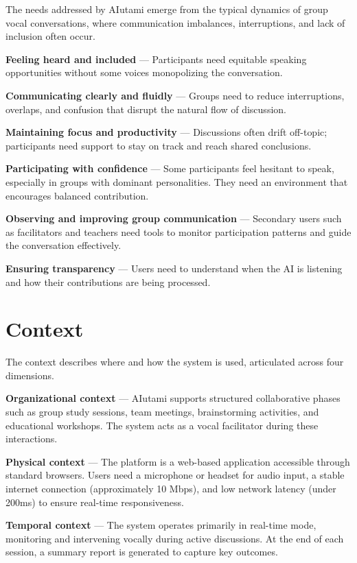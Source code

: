 The needs addressed by AIutami emerge from the typical dynamics of group vocal conversations, where communication imbalances, interruptions, and lack of inclusion often occur.

\textbf{Feeling heard and included} --- Participants need equitable speaking opportunities without some voices monopolizing the conversation.

\textbf{Communicating clearly and fluidly} --- Groups need to reduce interruptions, overlaps, and confusion that disrupt the natural flow of discussion.

\textbf{Maintaining focus and productivity} --- Discussions often drift off-topic; participants need support to stay on track and reach shared conclusions.

\textbf{Participating with confidence} --- Some participants feel hesitant to speak, especially in groups with dominant personalities. They need an environment that encourages balanced contribution.

\textbf{Observing and improving group communication} --- Secondary users such as facilitators and teachers need tools to monitor participation patterns and guide the conversation effectively.

\textbf{Ensuring transparency} --- Users need to understand when the AI is listening and how their contributions are being processed.

\section{Context}

The context describes where and how the system is used, articulated across four dimensions.

\textbf{Organizational context} --- AIutami supports structured collaborative phases such as group study sessions, team meetings, brainstorming activities, and educational workshops. The system acts as a vocal facilitator during these interactions.

\textbf{Physical context} --- The platform is a web-based application accessible through standard browsers. Users need a microphone or headset for audio input, a stable internet connection (approximately 10 Mbps), and low network latency (under 200ms) to ensure real-time responsiveness.

\textbf{Temporal context} --- The system operates primarily in real-time mode, monitoring and intervening vocally during active discussions. At the end of each session, a summary report is generated to capture key outcomes.

